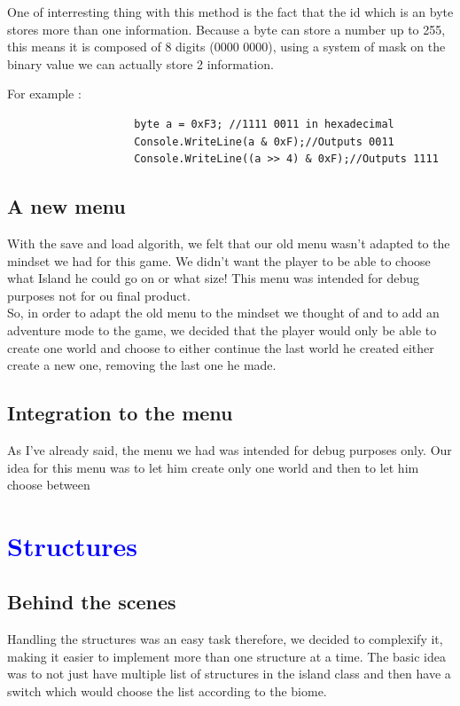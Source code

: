 \documentclass[article]{report}             %
\begin{document}
				One of interresting thing with this method is the fact that the id which is an byte stores more than one information. Because a byte can store a number up to 255, this means it is composed of 8 digits (0000 0000), using a system of mask on the binary value we can actually store 2 information.

				For example : 
				\begin{lstlisting}
					byte a = 0xF3; //1111 0011 in hexadecimal
					Console.WriteLine(a & 0xF);//Outputs 0011
					Console.WriteLine((a >> 4) & 0xF);//Outputs 1111
				\end{lstlisting}

			\section{A new menu}
					With the save and load algorith, we felt that our old menu wasn't adapted to the mindset we had for this game. We didn't want the player to be able to choose what Island he could go on or what size! This menu was intended for debug purposes not for ou final product.\\

					So, in order to adapt the old menu to the mindset we thought of and to add an adventure mode to the game, we decided that the player would only be able to create one world and choose to either continue the last world he created either create a new one, removing the last one he made.

			\section{Integration to the menu}
					As I've already said, the menu we had was intended for debug purposes only. Our idea for this menu was to let him create only one world and then to let him choose between 


		\chapter{\textcolor{blue}{Structures}}
			\section{Behind the scenes}
				Handling the structures was an easy task therefore, we decided to complexify it, making it easier to implement more than one structure at a time. The basic idea was to not just have multiple list of structures in the island class and then have a switch which would choose the list according to the biome.\\
\end{document}
